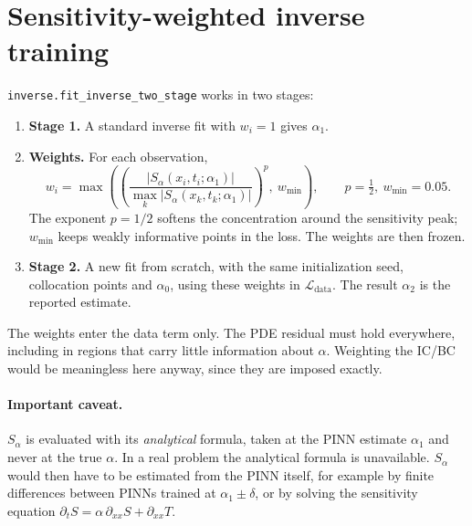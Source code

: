 \documentclass[10pt]{article}
\newcommand{\code}[1]{\texttt{#1}}
\begin{document}
\section{Sensitivity-weighted inverse training}
\code{inverse.fit\_inverse\_two\_stage} works in two stages:
\begin{enumerate}
\item \textbf{Stage 1.} A standard inverse fit with $w_i=1$ gives $\alpha_1$.
\item \textbf{Weights.} For each observation,
\begin{equation}
w_i=\max\!\left(\left(\frac{|S_\alpha(x_i,t_i;\alpha_1)|}{\max_k|S_\alpha(x_k,t_k;\alpha_1)|}\right)^{p},\ w_{\min}\right),\qquad p=\tfrac12,\ w_{\min}=0.05 .
\end{equation}
The exponent $p=1/2$ softens the concentration around the sensitivity peak; $w_{\min}$ keeps weakly informative points in the loss. The weights are then frozen.
\item \textbf{Stage 2.} A new fit from scratch, with the same initialization seed, collocation points and $\alpha_0$, using these weights in $\mathcal{L}_{\text{data}}$. The result $\alpha_2$ is the reported estimate.
\end{enumerate}
The weights enter the data term only. The PDE residual must hold everywhere, including in regions that carry little information about $\alpha$. Weighting the IC/BC would be meaningless here anyway, since they are imposed exactly.

\paragraph{Important caveat.} $S_\alpha$ is evaluated with its \emph{analytical} formula, taken at the PINN estimate $\alpha_1$ and never at the true $\alpha$. In a real problem the analytical formula is unavailable. $S_\alpha$ would then have to be estimated from the PINN itself, for example by finite differences between PINNs trained at $\alpha_1\pm\delta$, or by solving the sensitivity equation $\partial_t S=\alpha\,\partial_{xx}S+\partial_{xx}T$.
\end{document}
